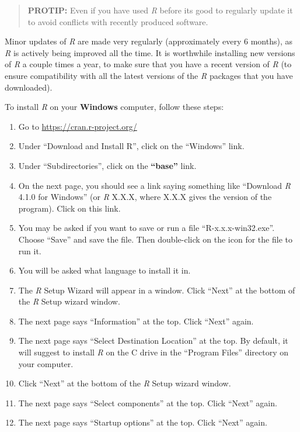 \documentclass[
]{book}
\providecommand{\tightlist}{%
  \setlength{\itemsep}{0pt}\setlength{\parskip}{0pt}}
\begin{document}
\begin{quote}
\textbf{PROTIP:} Even if you have used \emph{R} before its good to regularly update it to avoid conflicts with recently produced software.
\end{quote}

Minor updates of \emph{R} are made very regularly (approximately every 6 months), as \emph{R} is actively being improved all the time. It is worthwhile installing new versions of \emph{R} a couple times a year, to make sure that you have a recent version of \emph{R} (to ensure compatibility with all the latest versions of the \emph{R} packages that you have downloaded).

To install \emph{R} on your \textbf{Windows} computer, follow these steps:

\begin{enumerate}
\def\labelenumi{\arabic{enumi}.}
\tightlist
\item
  Go to \url{https://cran.r-project.org/}
\item
  Under ``Download and Install R'', click on the ``Windows'' link.
\item
  Under ``Subdirectories'', click on the \textbf{``base''} link.
\item
  On the next page, you should see a link saying something like ``Download \emph{R} 4.1.0 for Windows'' (or \emph{R} X.X.X, where X.X.X gives the version of the program). Click on this link.
\item
  You may be asked if you want to save or run a file ``R-x.x.x-win32.exe''. Choose ``Save'' and save the file. Then double-click on the icon for the file to run it.
\item
  You will be asked what language to install it in.
\item
  The \emph{R} Setup Wizard will appear in a window. Click ``Next'' at the bottom of the \emph{R} Setup wizard window.
\item
  The next page says ``Information'' at the top. Click ``Next'' again.
\item
  The next page says ``Select Destination Location'' at the top. By default, it will suggest to install \emph{R} on the C drive in the ``Program Files'' directory on your computer.
\item
  Click ``Next'' at the bottom of the \emph{R} Setup wizard window.
\item
  The next page says ``Select components'' at the top. Click ``Next'' again.
\item
  The next page says ``Startup options'' at the top. Click ``Next'' again.

\end{enumerate}
\end{document}
